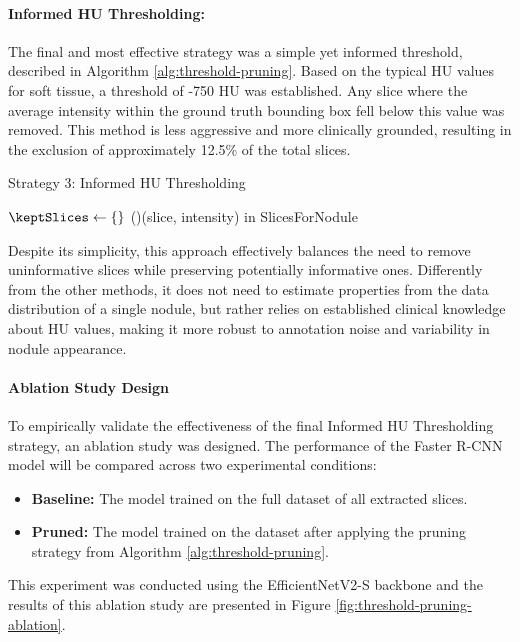 \paragraph{Informed HU Thresholding:} The final and most effective strategy was a simple yet informed threshold, described in Algorithm \ref{alg:threshold-pruning}. Based on the typical HU values for soft tissue, a threshold of -750 HU was established. Any slice where the average intensity within the ground truth bounding box fell below this value was removed. This method is less aggressive and more clinically grounded, resulting in the exclusion of approximately 12.5\% of the total slices.

\begin{algorithm}[H]
    \caption{Strategy 3: Informed HU Thresholding}
    \label{alg:threshold-pruning}
    \DontPrintSemicolon
    \SetAlgoLined

    
    \BlankLine
    
    $\keptSlices \gets \{\}$\;
    \ForAll(){(slice, intensity) \textup{in} SlicesForNodule}{
    }
    \Return{$\keptSlices$}\;
\end{algorithm}

Despite its simplicity, this approach effectively balances the need to remove uninformative slices while preserving potentially informative ones.
Differently from the other methods, it does not need to estimate properties from the data distribution of a single nodule, but rather relies on established clinical knowledge about HU values, making it more robust to annotation noise and variability in nodule appearance.

\paragraph{Ablation Study Design}
To empirically validate the effectiveness of the final Informed HU Thresholding strategy, an ablation study was designed. The performance of the Faster R-CNN model will be compared across two experimental conditions:
\begin{itemize}
    \item \textbf{Baseline:} The model trained on the full dataset of all extracted slices.
    \item \textbf{Pruned:} The model trained on the dataset after applying the pruning strategy from Algorithm \ref{alg:threshold-pruning}.
\end{itemize}
This experiment was conducted using the EfficientNetV2-S backbone and the results of this ablation study are presented in Figure \ref{fig:threshold-pruning-ablation}.

